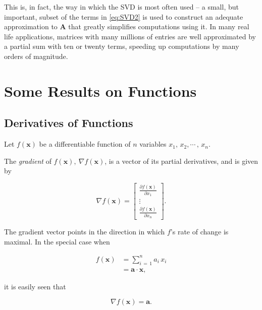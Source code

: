 \documentclass[graybox,envcountchap,sectrefs]{svmono}\usepackage[]{graphicx}\usepackage[]{xcolor}
\begin{document}
\begin{appendices}
This is, in fact, the way in which the SVD is most often used --
a small, but important, subset of the terms in \eqref{eq:SVD2} is
used to construct an adequate approximation to $\mathrm{\mathbf{A}}$
that greatly simplifies computations using it. In many real life applications,
matrices with many millions of entries are well approximated by a
partial sum with ten or twenty terms, speeding up computations by
many orders of magnitude.

\section{Some Results on Functions}

\subsection{Derivatives of Functions}

Let $f\left(\mathrm{\mathbf{x}}\right)$ be a differentiable function
of $n$ variables $x_{1},\,x_{2},\cdots\,,\,x_{n}$.

The \emph{gradient} of $f\left(\mathrm{\mathbf{x}}\right),\ \nabla f\left(\mathrm{\mathbf{x}}\right)$,
is a vector of its partial derivatives, and is given by

\begin{equation}
\nabla f\left(\mathrm{\mathbf{x}}\right)=\left[\begin{array}{c}
\frac{\partial f\left(\mathrm{\mathbf{x}}\right)}{\partial x_{1}}\\
\vdots\\
\frac{\partial f\left(\mathrm{\mathbf{x}}\right)}{\partial x_{n}}
\end{array}\right].\label{eq:GradientFx}
\end{equation}

The gradient vector points in the direction in which $f$'s rate of
change is maximal. In the special case when 

\begin{align}
f\left(\mathrm{\mathbf{x}}\right) & =\sum_{i\,=\,1}^{n}a_{i}\,x_{i}\nonumber \\
 & =\mathrm{\mathbf{a}}\cdotp\mathrm{\mathbf{x}},\label{eq:fx_dot_product}
\end{align}

it is easily seen that

\begin{equation}
\nabla f\left(\mathrm{\mathbf{x}}\right)=\mathrm{\mathbf{a}}.\label{eq:GradientDotProduct}
\end{equation}


\end{appendices}
\end{document}

